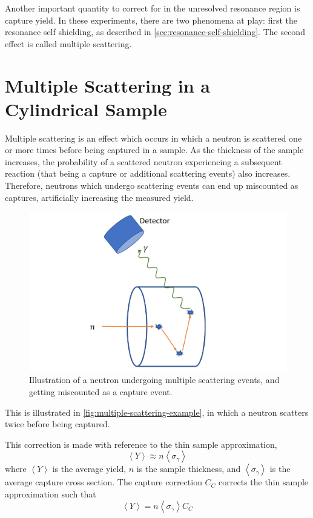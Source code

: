 Another important quantity to correct for in the unresolved resonance region is capture yield. In these experiments, there are two phenomena at play: first the resonance self shielding, as described in \autoref{sec:resonance-self-shielding}. The second effect is called multiple scattering.

\section{Multiple Scattering in a Cylindrical Sample}
\label{sec:multiple-scattering}

Multiple scattering is an effect which occurs in which a neutron is scattered one or more times before being captured in a sample. As the thickness of the sample increases, the probability of a scattered neutron experiencing a subsequent reaction (that being a capture or additional scattering events) also increases. Therefore, neutrons which undergo scattering events can end up miscounted as captures, artificially increasing the measured yield.
\begin{figure}[H]
    \centering
    \includegraphics[width=0.75\linewidth]{Capture Yield/Figures/multiplescattering.png}
    \caption{Illustration of a neutron undergoing multiple scattering events, and getting miscounted as a capture event.}
    \label{fig:multiple-scattering-example}
\end{figure}
This is illustrated in \autoref{fig:multiple-scattering-example}, in which a neutron scatters twice before being captured.

This correction is made with reference to the thin sample approximation,
\begin{equation}
    \label{eq:thin-sample-approximation}
    \left\langle Y \right\rangle \approx n \left\langle \sigma_\gamma \right\rangle 
\end{equation}
where $\left\langle Y \right\rangle$ is the average yield, $n$ is the sample thickness, and $\left\langle \sigma_\gamma \right\rangle$ is the average capture cross section. The capture correction $C_C$ corrects the thin sample approximation such that
\begin{equation}
    \label{eq:correction-thin-sample-approximation}
    \left\langle Y \right\rangle = n \left\langle \sigma_\gamma \right\rangle C_C
\end{equation}

